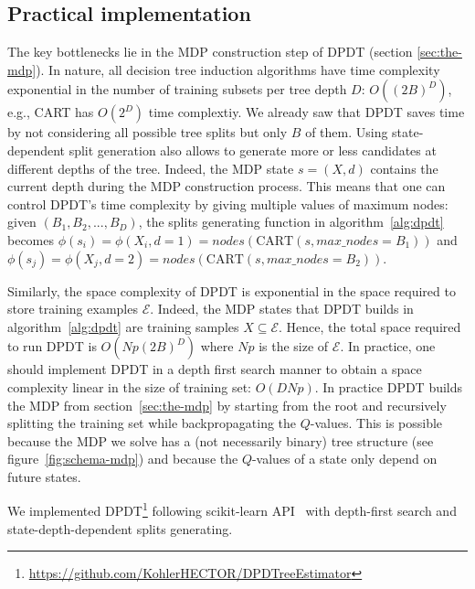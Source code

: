 \subsection{Practical implementation}

The key bottlenecks lie in the MDP construction step of DPDT (section \ref{sec:the-mdp}). In nature, all decision tree induction algorithms have time complexity exponential in the number of training subsets per tree depth $D$: $O((2B)^D)$, e.g., CART has $O(2^D)$ time complextiy. We already saw that DPDT saves time by not considering all possible tree splits but only $B$ of them. Using state-dependent split generation also allows to generate more or less candidates at different depths of the tree. Indeed, the MDP state $s = (X,d)$ contains the current depth during the MDP construction process. This means that one can control DPDT's time complexity by giving multiple values of maximum nodes: given $(B_1, B_2, ..., B_D)$, the splits generating function in algorithm~\ref{alg:dpdt} becomes $\phi(s_i) = \phi(X_i, d=1) = nodes(\text{CART}(s, max\_nodes=B_1))$ and  $\phi(s_j) = \phi(X_j, d=2) = nodes(\text{CART}(s, max\_nodes=B_2))$.

Similarly, the space complexity of DPDT is exponential in the space required to store training examples $\mathcal E$. Indeed, the MDP states that DPDT builds in algorithm~\ref{alg:dpdt} are training samples $X\subseteq \mathcal E$. Hence, the total space required to run DPDT is $O({Np}(2B)^{D})$ where $Np$ is the size of $\mathcal{E}$. In practice, one should implement DPDT in a depth first search manner to obtain a space complexity linear in the size of training set: $O(DNp)$. In practice DPDT builds the MDP from section~\ref{sec:the-mdp} by starting from the root and recursively splitting the training set while backpropagating the $Q$-values. This is possible because the MDP we solve has a (not necessarily binary) tree structure (see figure~\ref{fig:schema-mdp}) and because the $Q$-values of a state only depend on future states. 

We implemented DPDT\footnote{\url{https://github.com/KohlerHECTOR/DPDTreeEstimator}} following scikit-learn API~\cite{sklearn_api} with depth-first search and state-depth-dependent splits generating. 